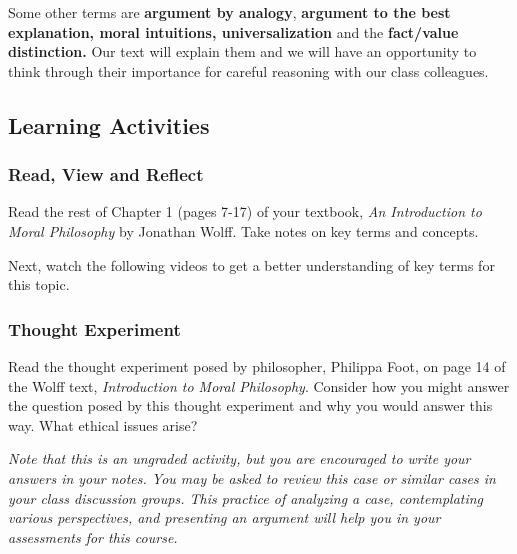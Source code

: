 \documentclass[
]{book}
\begin{document}
Some other terms are \textbf{argument by analogy}, \textbf{argument to the best
explanation, moral intuitions, universalization} and the \textbf{fact/value
distinction.} Our text will explain them and we will have an opportunity to
think through their importance for careful reasoning with our class colleagues.

\begin{reflect}
\hypertarget{learning-activities-1}{%
\subsection*{Learning Activities}\label{learning-activities-1}}

\hypertarget{read-view-and-reflect}{%
\subsubsection*{Read, View and Reflect}\label{read-view-and-reflect}}

Read the rest of Chapter 1 (pages 7-17) of your textbook, \emph{An Introduction to
Moral Philosophy} by Jonathan Wolff. Take notes on key terms and concepts.

Next, watch the following videos to get a better understanding of key terms for
this topic.

\hypertarget{thought-experiment}{%
\subsubsection*{Thought Experiment}\label{thought-experiment}}

Read the thought experiment posed by philosopher, Philippa Foot, on page 14 of the Wolff text, \emph{Introduction to Moral Philosophy}. Consider how you might answer the question posed by this thought experiment and why you would answer this way. What ethical issues arise?
\end{reflect}

\begin{caution}
\emph{Note that this is an ungraded activity, but you are encouraged to write your answers in your notes. You may be asked to review this case or similar cases in your class discussion groups. This practice of analyzing a case, contemplating various perspectives, and presenting an argument will help you in your assessments for this course.}
\end{caution}
\end{document}
